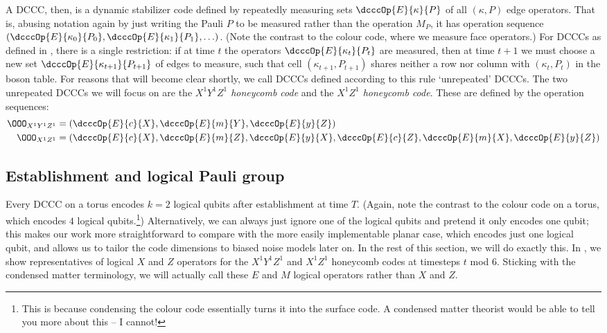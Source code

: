 A DCCC, then, is a dynamic stabilizer code defined by
repeatedly measuring sets $\dcccOp{E}{\kappa}{P}$ of all $(\kappa, P)$ edge operators.
That is, abusing notation again by just writing the Pauli $P$ to be measured rather than the operation $M_P$, it has operation sequence $\left(\dcccOp{E}{\kappa_0}{P_0},\dcccOp{E}{\kappa_1}{P_1},\ldots\right)$.
(Note the contrast to the colour code, where we measure face operators.)
For DCCCs as defined in , there is a single restriction:
if at time $t$ the operators $\dcccOp{E}{\kappa_t}{P_{t}}$ are measured,
then at time $t+1$ we must choose a new set $\dcccOp{E}{\kappa_{t+1}}{P_{t+1}}$ of edges to measure,
such that cell $(\kappa_{t+1}, P_{t+1})$ shares neither a row nor column with $(\kappa_t, P_t)$ in the boson table.
For reasons that will become clear shortly, we call DCCCs defined according to this rule `unrepeated' DCCCs.
The two unrepeated DCCCs we will focus on are
the \textit{$X^1Y^1Z^1$ honeycomb code} and the \textit{$X^1Z^1$ honeycomb code}.
These are defined by the operation sequences:
\begin{equation}\label{eq:honeycomb_codes_measurement_schedules}
\begin{aligned}
    \OOO_{X^1Y^1Z^1} &= \left(
    \dcccOp{E}{c}{X},
    \dcccOp{E}{m}{Y},
    \dcccOp{E}{y}{Z}
    \right)\\
    \OOO_{X^1Z^1} &= \left(
    \dcccOp{E}{c}{X},
    \dcccOp{E}{m}{Z},
    \dcccOp{E}{y}{X},
    \dcccOp{E}{c}{Z},
    \dcccOp{E}{m}{X},
    \dcccOp{E}{y}{Z}
    \right)
\end{aligned}
\end{equation}

\subsection{Establishment and logical Pauli group}

Every DCCC on a torus encodes $k=2$ logical qubits after establishment at time $T$.
(Again, note the contrast to the colour code on a torus, which encodes $4$ logical qubits.\footnote{This is because condensing the colour code essentially turns it into the surface code. A condensed matter theorist would be able to tell you more about this -- I cannot!})
Alternatively, we can always just ignore one of the logical qubits and pretend it only encodes one qubit; this makes our work more straightforward to compare with the more easily implementable planar case, which encodes just one logical qubit, and allows us to tailor the code dimensions to biased noise models later on.
In the rest of this section, we will do exactly this.
In , we show representatives of logical $X$ and $Z$ operators for the $X^1Y^1Z^1$ and $X^1Z^1$ honeycomb codes at timesteps $t$ mod $6$.
Sticking with the condensed matter terminology, we will actually call these $E$ and $M$ logical operators rather than $X$ and $Z$.

